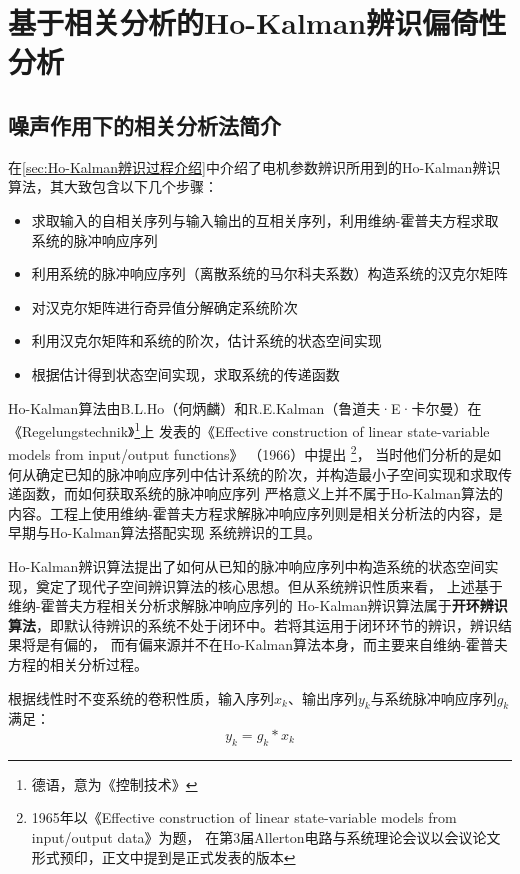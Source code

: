 \newpage
\section{基于相关分析的Ho-Kalman辨识偏倚性分析}
\label{sec:基于相关分析的Ho-Kalman辨识偏倚性分析}
\subsection{噪声作用下的相关分析法简介\label{sec:噪声作用下的相关分析法简介}}
在\ref{sec:Ho-Kalman辨识过程介绍}中介绍了电机参数辨识所用到的Ho-Kalman辨识算法，其大致包含以下几个步骤：
\begin{itemize}
    \item 求取输入的自相关序列与输入输出的互相关序列，利用维纳-霍普夫方程求取系统的脉冲响应序列
    \item 利用系统的脉冲响应序列（离散系统的马尔科夫系数）构造系统的汉克尔矩阵
    \item 对汉克尔矩阵进行奇异值分解确定系统阶次
    \item 利用汉克尔矩阵和系统的阶次，估计系统的状态空间实现
    \item 根据估计得到状态空间实现，求取系统的传递函数
\end{itemize}

Ho-Kalman算法由B.L.Ho（何炳麟）和R.E.Kalman（鲁道夫·E·卡尔曼）在《Regelungstechnik》\footnote{德语，意为《控制技术》}上
发表的《Effective construction of linear state-variable models from input/output functions》
（1966）中提出
\footnote{1965年以《Effective construction of linear state-variable models from input/output data》为题，
在第3届Allerton电路与系统理论会议以会议论文形式预印，正文中提到是正式发表的版本}，
当时他们分析的是如何从确定已知的脉冲响应序列中估计系统的阶次，并构造最小子空间实现和求取传递函数，而如何获取系统的脉冲响应序列
严格意义上并不属于Ho-Kalman算法的内容。工程上使用维纳-霍普夫方程求解脉冲响应序列则是相关分析法的内容，是早期与Ho-Kalman算法搭配实现
系统辨识的工具。

Ho-Kalman辨识算法提出了如何从已知的脉冲响应序列中构造系统的状态空间实现，奠定了现代子空间辨识算法的核心思想。但从系统辨识性质来看，
上述基于维纳-霍普夫方程相关分析求解脉冲响应序列的
Ho-Kalman辨识算法属于\textbf{开环辨识算法}，即默认待辨识的系统不处于闭环中。若将其运用于闭环环节的辨识，辨识结果将是有偏的，
而有偏来源并不在Ho-Kalman算法本身，而主要来自维纳-霍普夫方程的相关分析过程。

根据线性时不变系统的卷积性质，输入序列\(x_k\)、输出序列\(y_k\)与系统脉冲响应序列\(g_k\)满足：
\begin{equation*}
    y_k = g_k * x_k
\end{equation*}

